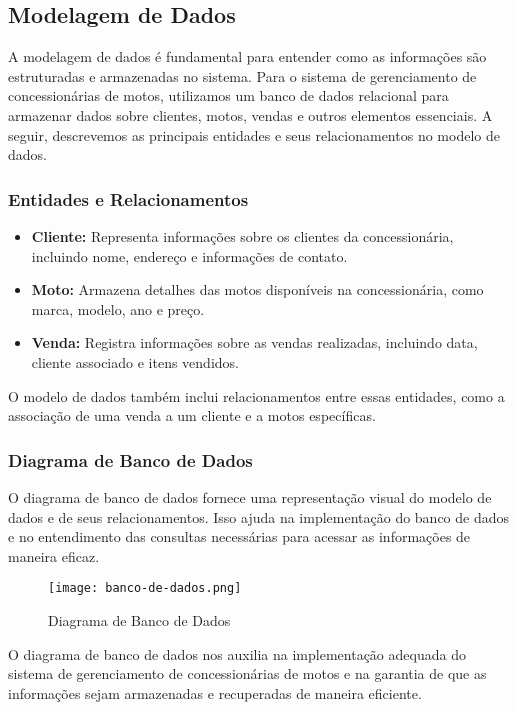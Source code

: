 \subsection{Modelagem de Dados}

A modelagem de dados é fundamental para entender como as informações são estruturadas e armazenadas no sistema. Para o sistema de gerenciamento de concessionárias de motos, utilizamos um banco de dados relacional para armazenar dados sobre clientes, motos, vendas e outros elementos essenciais. A seguir, descrevemos as principais entidades e seus relacionamentos no modelo de dados.

\subsubsection{Entidades e Relacionamentos}

\begin{itemize}
	\item \textbf{Cliente:} Representa informações sobre os clientes da concessionária, incluindo nome, endereço e informações de contato.
	\item \textbf{Moto:} Armazena detalhes das motos disponíveis na concessionária, como marca, modelo, ano e preço.
	\item \textbf{Venda:} Registra informações sobre as vendas realizadas, incluindo data, cliente associado e itens vendidos.
\end{itemize}

O modelo de dados também inclui relacionamentos entre essas entidades, como a associação de uma venda a um cliente e a motos específicas.

\subsubsection{Diagrama de Banco de Dados}

O diagrama de banco de dados fornece uma representação visual do modelo de dados e de seus relacionamentos. Isso ajuda na implementação do banco de dados e no entendimento das consultas necessárias para acessar as informações de maneira eficaz.

\begin{figure}[h]
	\centering
	\texttt{[image: banco-de-dados.png]}
	\caption{Diagrama de Banco de Dados}
	\label{fig:Diagrama de Banco de Dados}
\end{figure}

O diagrama de banco de dados nos auxilia na implementação adequada do sistema de gerenciamento de concessionárias de motos e na garantia de que as informações sejam armazenadas e recuperadas de maneira eficiente.

